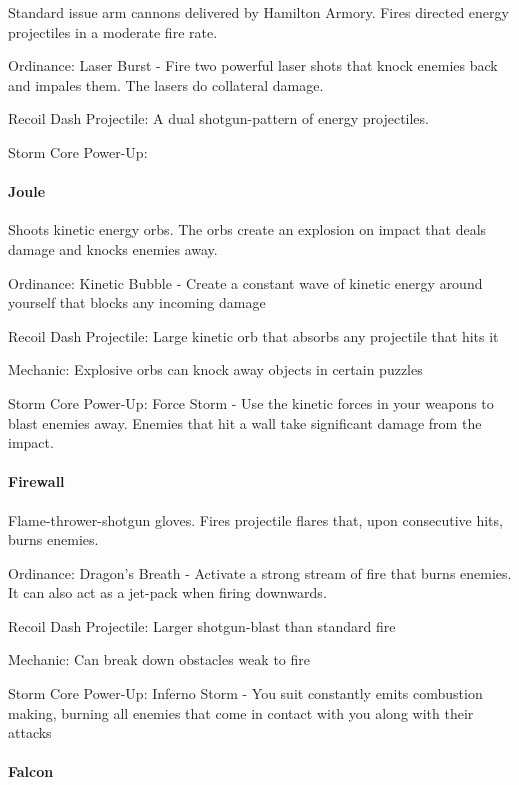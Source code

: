 \documentclass[../Main.tex]{subfiles}
\begin{document}
Standard issue arm cannons delivered by Hamilton Armory. Fires directed energy projectiles in a moderate fire rate. 

Ordinance: Laser Burst - Fire two powerful laser shots that knock enemies back and impales them. The lasers do collateral damage. 

Recoil Dash Projectile: A dual shotgun-pattern of energy projectiles.

Storm Core Power-Up:

\paragraph{Joule}

Shoots kinetic energy orbs. The orbs create an explosion on impact that deals damage and knocks enemies away. 

Ordinance: Kinetic Bubble - Create a constant wave of kinetic energy around yourself that blocks any incoming damage

Recoil Dash Projectile: Large kinetic orb that absorbs any projectile that hits it

Mechanic: Explosive orbs can knock away objects in certain puzzles

Storm Core Power-Up: Force Storm - Use the kinetic forces in your weapons to blast enemies away. Enemies that hit a wall take significant damage from the impact. 

\paragraph{Firewall}

Flame-thrower-shotgun gloves. Fires projectile flares that, upon consecutive hits, burns enemies.

Ordinance: Dragon's Breath - Activate a strong stream of fire that burns enemies. It can also act as a jet-pack when firing downwards.

Recoil Dash Projectile: Larger shotgun-blast than standard fire

Mechanic: Can break down obstacles weak to fire

Storm Core Power-Up: Inferno Storm - You suit constantly emits combustion making, burning all enemies that come in contact with you along with their attacks

\paragraph{Falcon}
\end{document}

